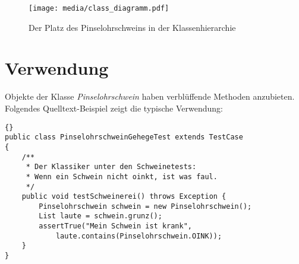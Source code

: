 \begin{figure}[tbp]
	\centering
	\texttt{[image: media/class\_diagramm.pdf]}
	\caption{Der Platz des Pinselohrschweins in der Klassenhierarchie}
	\label{diagramm}
\end{figure}

\section{Verwendung}\label{sec:verwendung} %
Objekte der Klasse \emph{Pinselohrschwein} haben verblüffende Methoden anzubieten. Folgendes Quelltext-Beispiel zeigt die typische Verwendung:

\begin{lstlisting}[frame=tb]{}
public class PinselohrschweinGehegeTest extends TestCase
{
	/**
	 * Der Klassiker unter den Schweinetests: 
	 * Wenn ein Schwein nicht oinkt, ist was faul.
	 */
	public void testSchweinerei() throws Exception {
		Pinselohrschwein schwein = new Pinselohrschwein();
		List laute = schwein.grunz();
		assertTrue("Mein Schwein ist krank", 
			laute.contains(Pinselohrschwein.OINK));
	}
}
\end{lstlisting}


